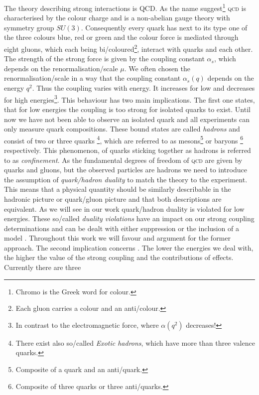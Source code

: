 \documentclass[../../index.tex]{subfiles}
\begin{document}
The theory describing strong interactions is \textsc{QCD}. As the name
suggest\footnote{Chromo is the Greek word for colour.} \textsc{qcd} is
characterised by the colour charge and is a non-abelian gauge theory with
symmetry group $SU(3)$. Consequently every quark has next to its type one of the
three colours blue, red or green and the colour force is mediated through eight
gluons, which each being bi\-/coloured\footnote{Each gluon carries a colour and
  an anti\-/colour.}, interact with quarks and each other. The strength of the
strong force is given by the coupling constant $\alpha_s$, which depends on the
renormalisation\-/scale $\mu$. We often chosen the renormalisation\-/scale in a
way that the coupling constant $\alpha_s(q)$ depends on the energy $q^2$. Thus
the coupling varies with energy. It increases for low and decreases for high
energies\footnote{In contrast to the electromagnetic force, where $\alpha(q^2)$
  decreases!}. This behaviour has two main implications. The first one states,
that for low energies the coupling is too strong for isolated quarks to exist.
Until now we have not been able to observe an isolated quark and all experiments
can only measure quark compositions. These bound states are called
\textit{hadrons} and consist of two or three quarks \footnote{There exist also
  so\-/called \textit{Exotic hadrons}, which have more than three valence
  quarks.}, which are referred to as mesons\footnote{Composite of a quark and an
  anti\-/quark.} or baryons \footnote{Composite of three quarks or three
  anti\-/quarks.} respectively. This phenomenon, of quarks sticking together as
hadrons is referred to as \textit{confinement}. As the fundamental degrees of
freedom of \textsc{qcd} are given by quarks and gluons, but the observed
particles are hadrons we need to introduce the assumption of
\textit{quark\-/hadron duality} to match the theory to the experiment. This
means that a physical quantity should be similarly describable in the hadronic
picture or quark\-/gluon picture and that both descriptions are equivalent. As
we will see in our work quark\-/hadron duality is violated for low energies.
These so\-/called \textit{duality violations} have an impact on our strong
coupling determinations and can be dealt with either suppression or the
inclusion of a model \cite{Pich2006,Cata2008}. Throughout this work we will
favour and argument for the former approach. The second implication concerns
. The lower the energies we deal with, the
higher the value of the strong coupling and the contributions of
 effects. Currently there are three
\end{document}

